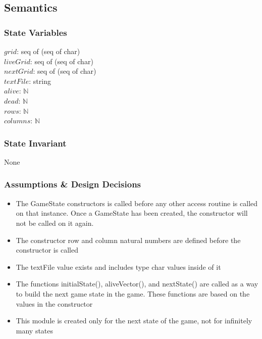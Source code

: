 \documentclass[12pt]{article}
\begin{document}
\subsection* {Semantics}

\subsubsection* {State Variables}

$grid$: seq of (seq of char)\\
$liveGrid$: seq of (seq of char)\\
$nextGrid$: seq of (seq of char)\\
$textFile$: string\\
$alive$: $\mathbb{N}$\\
$dead$: $\mathbb{N}$\\
$rows$: $\mathbb{N}$\\
$columns$: $\mathbb{N}$



\subsubsection* {State Invariant}

None

\subsubsection* {Assumptions \& Design Decisions}

\begin{itemize}

\item The GameState constructors is called before any other
access routine is called on that instance. Once a GameState has been created, the constructor will not be called on it again.

\item The constructor row and column natural numbers are defined before the constructor is called

\item The textFile value exists and includes type char values inside of it

\item The functions initialState(), aliveVector(), and nextState() are called as a way to build the next game state in the game. These functions are based on the values in the constructor

\item This module is created only for the next state of the game, not for infinitely many states

\end{itemize}
\end{document}
